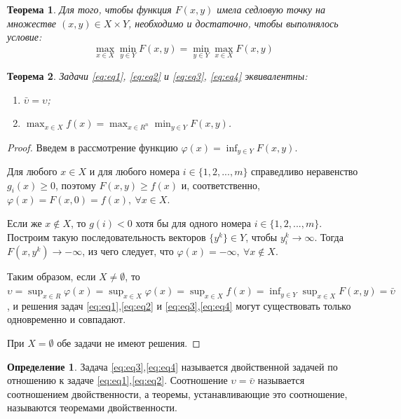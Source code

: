 \documentclass[12pt,a4paper,titlepage,oneside]{book}
\theoremstyle{definition}
\newtheorem{definition}{Определение}[chapter]
\theoremstyle{plain}
\newtheorem{theorem}{Теорема}[chapter]
\theoremstyle{remark}
\theoremstyle{remark}
\theoremstyle{plain}
\theoremstyle{plain}
\begin{document}
\begin{theorem}
Для того, чтобы функция $F(x,y)$ имела седловую точку на множестве $(x,y) \in X \times Y$, необходимо и достаточно, чтобы выполнялось условие:
$$\max_{x \in X} \min_{y \in Y} F(x,y) = \min_{y \in Y}\max_{x \in X} F(x,y)$$
\end{theorem}

\begin{theorem}
Задачи \eqref{eq:eq1}, \eqref{eq:eq2} и \eqref{eq:eq3}, \eqref{eq:eq4} эквивалентны:  

\begin{enumerate}
\item $\bar{\upsilon} = \upsilon$;
\item $\displaystyle \max_{x \in X} f(x) =  \max_{x \in \textit{R} ^n} \min_{y \in Y} F(x,y)$.
\end{enumerate}
\end{theorem}

\begin{proof}
Введем в рассмотрение функцию $\displaystyle \varphi(x)=\inf_{y \in Y} F(x,y).$

Для любого $x \in X$ и для любого номера $i \in \{1,2,...,m\}$ справедливо неравенство $g_i(x) \geqslant 0$, поэтому $F(x,y) \geqslant f(x)$ и, соответственно, $\varphi(x) = F(x,0) = f(x),~ \forall x \in X$. 

Если же $x \notin X$, то $g(i) < 0$ хотя бы для одного номера $i \in \{1,2,...,m\}$. Построим такую последовательность векторов $\{y^k\} \in Y$, чтобы  $y_i^k \rightarrow \infty$. Тогда $F(x,y^k) \rightarrow -\infty$, из чего следует, что $\varphi(x) = -\infty,~ \forall x \notin X$.

Таким образом, если $X \neq \emptyset$, то $\displaystyle \upsilon = \sup_{x \in R} \varphi(x) = \sup_{x \in X} \varphi(x) = \sup_{x \in X} f(x) = \inf_{y \in Y}\sup_{x \in X} F(x,y) = \bar{\upsilon}$, и решения задач \eqref{eq:eq1},\eqref{eq:eq2} и \eqref{eq:eq3},\eqref{eq:eq4} могут существовать только одновременно и совпадают.

При $X = \emptyset$ обе задачи не имеют решения.
\end{proof}

\begin{definition}
Задача \eqref{eq:eq3},\eqref{eq:eq4} называется двойственной задачей по отношению к задаче \eqref{eq:eq1},\eqref{eq:eq2}. Соотношение $\upsilon = \bar{\upsilon}$ называется соотношением двойственности, а теоремы, устанавливающие это соотношение, называются теоремами двойственности. 
\end{definition}
\end{document}
